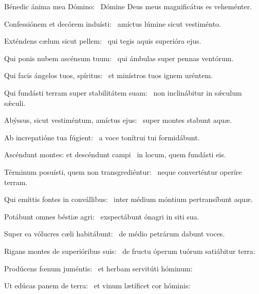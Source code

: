 \item Bénedic ánima mea Dómino:~\psstar{} Dómine Deus meus magnificátus es veheménter.

\item Confessiónem et decórem induísti:~\psstar{} amíctus lúmine sicut vestiménto.

\item Exténdens cælum sicut pellem:~\psstar{} qui tegis aquis superióra ejus.

\item Qui ponis nubem ascénsum tuum:~\psstar{} qui ámbulas super pennas ventórum.

\item Qui facis ángelos tuos, spíritus:~\psstar{} et minístros tuos ignem uréntem.

\item Qui fundásti terram super stabilitátem suam:~\psstar{} non inclinábitur in sǽculum sǽculi.

\item Abýssus, sicut vestiméntum, amíctus ejus:~\psstar{} super montes stabunt aquæ.

\item Ab increpatióne tua fúgient:~\psstar{} a voce tonítrui tui formidábunt.

\item Ascéndunt montes: et descéndunt campi~\psstar{} in locum, quem fundásti eis.

\item Términum posuísti, quem non transgrediéntur:~\psstar{} neque converténtur operíre terram.

\item Qui emíttis fontes in convállibus:~\psstar{} inter médium móntium pertransíbunt aquæ.

\item Potábunt omnes béstiæ agri:~\psstar{} exspectábunt ónagri in siti sua.

\item Super ea vólucres cæli habitábunt:~\psstar{} de médio petrárum dabunt voces.

\item Rigans montes de superióribus suis:~\psstar{} de fructu óperum tuórum satiábitur terra:

\item Prodúcens fœnum juméntis:~\psstar{} et herbam servitúti hóminum:

\item Ut edúcas panem de terra:~\psstar{} et vinum lætíficet cor hóminis:

